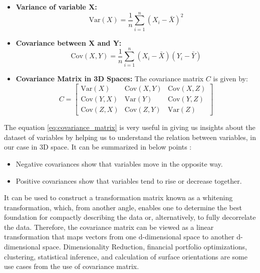\begin{itemize}
    \item \textbf{Variance of variable X:}
    \begin{equation}
    \text{Var}(X) = \frac{1}{n} \sum_{i=1}^{n} (X_i - \bar{X})^2
    \end{equation}
    
    \item \textbf{Covariance between X and Y:}
    \begin{equation}\label{eq:covariance}
    \text{Cov}(X, Y) = \frac{1}{n} \sum_{i=1}^{n} (X_i - \bar{X})(Y_i - \bar{Y})
    \end{equation}
    
    \item \textbf{Covariance Matrix in 3D Spaces:}
    The covariance matrix \(C\) is given by:
    \begin{equation}\label{eq:covariance_matrix}
    C = \begin{bmatrix}
    \text{Var}(X) & \text{Cov}(X, Y) & \text{Cov}(X, Z) \\
    \text{Cov}(Y, X) & \text{Var}(Y) & \text{Cov}(Y, Z) \\
    \text{Cov}(Z, X) & \text{Cov}(Z, Y) & \text{Var}(Z)
    \end{bmatrix}
    \end{equation}
\end{itemize}

The equation \ref{eq:covariance_matrix} is very useful in giving us insights about the dataset of variables by helping us to understand the relation between variables, in our case in 3D space. It can be summarized in below points :
\begin{itemize}
    \item  Negative covariances show that variables move in the opposite way.
    \item Positive covariances show that variables tend to rise or decrease together.
\end{itemize}

It can be used to construct a transformation matrix known as a whitening transformation, which, from another angle, enables one to determine the best foundation for compactly describing the data or, alternatively, to fully decorrelate the data. Therefore, the covariance matrix can be viewed as a linear transformation that maps vectors from one d-dimensional space to another d-dimensional space. Dimensionality Reduction, financial portfolio optimizations, clustering, statistical inference, and calculation of surface orientations are some use cases from the use of covariance matrix.

